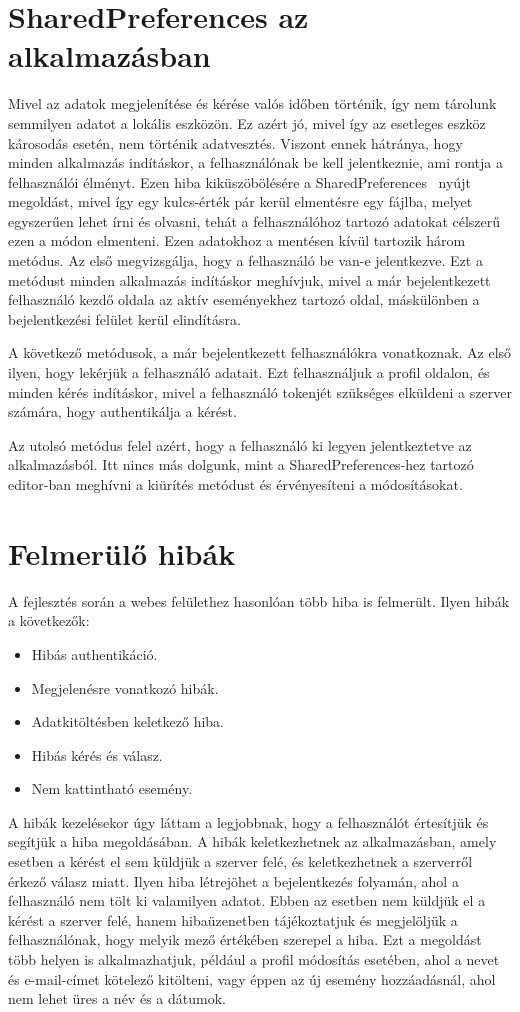 \documentclass[
]{thesis-ekf}
\theoremstyle{definition}
\theoremstyle{remark}
\begin{document}
	\section{SharedPreferences az alkalmazásban}
	Mivel az adatok megjelenítése és kérése valós időben történik, így nem tárolunk semmilyen adatot a lokális eszközön. Ez azért jó, mivel így az esetleges eszköz károsodás esetén, nem történik adatvesztés. Viszont ennek hátránya, hogy minden alkalmazás indításkor, a felhasználónak be kell jelentkeznie, ami rontja a felhasználói élményt. Ezen hiba kiküszöbölésére a SharedPreferences~\cite{sharedPref_android} nyújt megoldást, mivel így egy kulcs-érték pár kerül elmentésre egy fájlba, melyet egyszerűen lehet írni és olvasni, tehát a felhasználóhoz tartozó adatokat célszerű ezen a módon elmenteni.
	Ezen adatokhoz a mentésen kívül tartozik három metódus. Az első megvizsgálja, hogy a felhasználó be van-e jelentkezve. Ezt a metódust minden alkalmazás indításkor meghívjuk, mivel a már bejelentkezett felhasználó kezdő oldala az aktív eseményekhez tartozó oldal, máskülönben a bejelentkezési felület kerül elindításra.
	
	A következő metódusok, a már bejelentkezett felhasználókra vonatkoznak. Az első ilyen, hogy lekérjük a felhasználó adatait. Ezt felhasználjuk a profil oldalon, és minden kérés indításkor, mivel a felhasználó tokenjét szükséges elküldeni a szerver számára, hogy authentikálja a kérést.
	
	Az utolsó metódus felel azért, hogy a felhasználó ki legyen jelentkeztetve az alkalmazásból. Itt nincs más dolgunk, mint a SharedPreferences-hez tartozó editor-ban meghívni a kiürítés metódust és érvényesíteni a módosításokat.  
	
	\section{Felmerülő hibák}
	A fejlesztés során a webes felülethez hasonlóan több hiba is felmerült. Ilyen hibák a következők:
	\begin{itemize}
		\item Hibás authentikáció.
		\item Megjelenésre vonatkozó hibák.
		\item Adatkitöltésben keletkező hiba.
		\item Hibás kérés és válasz.
		\item Nem kattintható esemény.
	\end{itemize}
	A hibák kezelésekor úgy láttam a legjobbnak, hogy a felhasználót értesítjük és segítjük a hiba megoldásában. A hibák keletkezhetnek az alkalmazásban, amely esetben a kérést el sem küldjük a szerver felé, és keletkezhetnek a szerverről érkező válasz miatt. Ilyen hiba létrejöhet a bejelentkezés folyamán, ahol a felhasználó nem tölt ki valamilyen adatot. Ebben az esetben nem küldjük el a kérést a szerver felé, hanem hibaüzenetben tájékoztatjuk és megjelöljük a felhasználónak, hogy melyik mező értékében szerepel a hiba. Ezt a megoldást több helyen is alkalmazhatjuk, például a profil módosítás esetében, ahol a nevet és e-mail-címet kötelező kitölteni, vagy éppen az új esemény hozzáadásnál, ahol nem lehet üres a név és a dátumok. 
	
\end{document}
